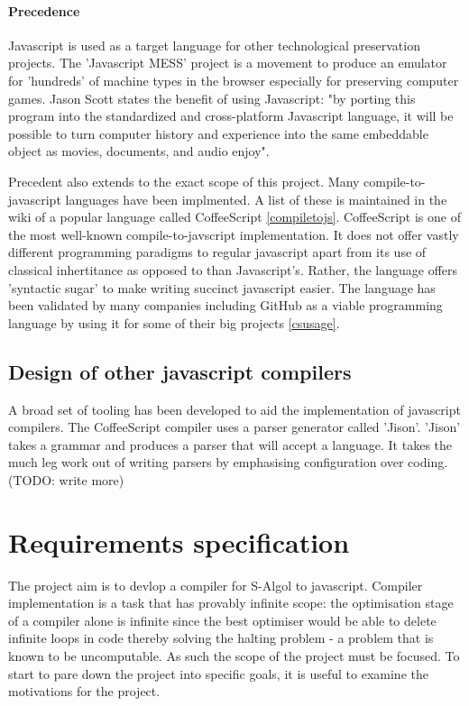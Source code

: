 \documentclass{article}
\begin{document}
\paragraph{Precedence} Javascript is used as a target language for other technological preservation projects. The 'Javascript MESS' project is a movement to produce an emulator for 'hundreds' of machine types in the browser especially for preserving computer games. Jason Scott states the benefit of using Javascript: "by porting this program into the standardized and cross-platform Javascript language, it will be possible to turn computer history and experience into the same embeddable object as movies, documents, and audio enjoy". \cite{TODO}

Precedent also extends to the exact scope of this project. Many compile-to-javascript languages have been implmented. A list of these is maintained in the wiki of a popular language called CoffeeScript \ref{compiletojs}. CoffeeScript is one of the most well-known compile-to-javscript implementation. It does not offer vastly different programming paradigms to regular javascript apart from its use of classical inhertitance as opposed to than Javascript's. Rather, the language offers 'syntactic sugar' to make writing succinct javascript easier. The language has been validated by many companies including GitHub as a viable programming language by using it for some of their big projects \ref{csusage}.


\subsection{Design of other javascript compilers}

A broad set of tooling has been developed to aid the implementation of javascript compilers. The CoffeeScript compiler uses a parser generator called 'Jison'. 'Jison' takes a grammar and produces a parser that will accept a language. It takes the much leg work out of writing parsers by emphasising configuration over coding. (TODO: write more)

\section{Requirements specification}

The project aim is to devlop a compiler for S-Algol to javascript. Compiler implementation is a task that has provably infinite scope:  the optimisation stage of a compiler alone is infinite since the best optimiser would be able to delete infinite loops in code thereby solving the halting problem - a problem that is known to be uncomputable. As such the scope of the project must be focused. To start to pare down the project into specific goals, it is useful to examine the motivations for the project.
\end{document}
